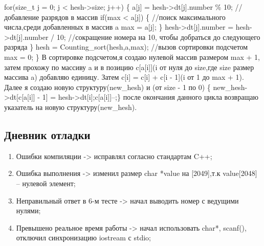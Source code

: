 \documentclass[12pt]{article}
\begin{document}
        for(size\_t j = 0; j < hesh->size; j++) \{\newline
            a[j] = hesh->dt[j].number \% 10; //добавление разрядов в массив\newline
            if(max < a[j]) \{ //поиск максимального числа,среди добавленных в массив a\newline
                max = a[j];\newline
           \}\newline
            hesh->dt[j].number = hesh->dt[j].number / 10; //сокращение номера на 10, чтобы добраться до следующего разряда\newline
        \}\newline
        hesh = Counting\_sort(hesh,a,max); //вызов сортировки подсчетом\newline
        max = 0;\newline
    \}\newline
В сортировке подсчетом,я создаю нулевой массив размером max + 1, затем прохожу по массиву a и в позицию c[a[i]](i от нуля до size,где size размер массива a) добавляю единицу. Затем c[i] = c[i] + c[i - 1](i от 1 до max + 1). Далее я создаю новую структуру(new\_hesh)  и \newline
(от size - 1 по 0) \{ \newline
new\_hesh->dt[c[a[i]] - 1] = hesh->dt[i];\newline c[a[i]]--;\newline \} \newline
после окончания данного цикла возвращаю указатель на новую структуру(new\_hesh).



\subsection*{Дневник отладки}
\begin{enumerate}
\item Ошибки компиляции -> исправлял согласно стандартам C++;
\item Ошибка выполнения -> изменил  размер char *value на [2049],т.к value[2048] -- нулевой элемент;
\item Неправильный ответ в 6-м тесте -> начал выводить номер с ведущими нулями;
\item Превышено реальное время работы -> начал использовать char*, scanf(), отключил синхронизацию iostream с stdio;
\end{enumerate}
\end{document}
